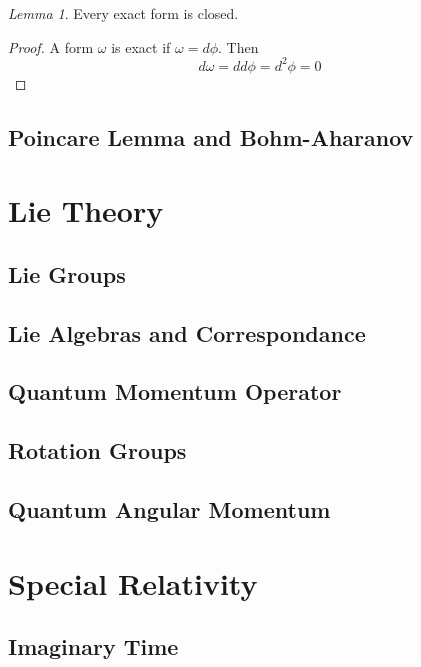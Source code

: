 \documentclass[12pt]{article}
\theoremstyle{definition}
\theoremstyle{remark}
\theoremstyle{example}
\theoremstyle{theorem}
\theoremstyle{lemma}
\newtheorem{lemma}{Lemma}
\begin{document}
\begin{lemma}
	Every exact form is closed.
	\begin{proof}
		A form $\omega$ is exact if $\omega=d\phi$. Then
		\begin{equation}
			d\omega=dd\phi=d^2\phi=0
		\end{equation}
	\end{proof}
\end{lemma}




\subsection{Poincare Lemma and Bohm-Aharanov}

\section{Lie Theory}

\subsection{Lie Groups}

\subsection{Lie Algebras and Correspondance}

\subsection{Quantum Momentum Operator}

\subsection{Rotation Groups}

\subsection{Quantum Angular Momentum}

\section{Special Relativity}

\subsection{Imaginary Time}
\end{document}
